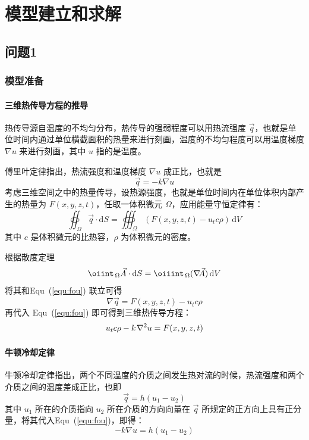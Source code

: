 \documentclass[../main.tex]{subfiles}
\begin{document}
\section{模型建立和求解}

\subsection{问题1}
\subsubsection{模型准备}
\paragraph{三维热传导方程的推导}
热传导源自温度的不均匀分布，热传导的强弱程度可以用热流强度 \(\vec{q}\)，也就是单位时间内通过单位横截面积的热量来进行刻画，温度的不均匀程度可以用温度梯度 \(\nabla u\) 来进行刻画，其中 \(u\) 指的是温度。

傅里叶定律指出，热流强度和温度梯度 \(\nabla u\) 成正比，也就是
\begin{equation}\label{equ:fou}
\vec q = - k \nabla u
\end{equation}
考虑三维空间之中的热量传导，设热源强度，也就是单位时间内在单位体积内部产生的热量为 \(F (x,  y , z, t)\)，任取一体积微元 \(\Omega\)，应用能量守恒定律有：
\begin{equation}
\oiint _{\, \Omega} \vec q \cdot \mathrm{d} S = \oiiint _{\, \Omega} ( F (x , y , z,t) - u _{t} c \rho ) \, \mathrm{d} V
\end{equation}
其中 \(c\) 是体积微元的比热容，\(\rho\) 为体积微元的密度。

根据散度定理
\begin{equation}
\oiint _{\,\Omega} \vec A  \cdot \mathrm{d} S = \oiiint _{\,\Omega} ( \nabla\kern -1.8pt\vec A) \, \mathrm{d}V
\end{equation}
将其和Equ~(\ref{equ:fou}) 联立可得
\begin{equation}
\nabla \vec q = F (x , y , z ,t) - u_{t} c \rho
\end{equation}
再代入 Equ~(\ref{equ:fou}) 即可得到三维热传导方程：
\begin{equation}\label{equ:cond}
u_{t} c \rho - k\kern 1pt \nabla^{2} u = F (x , y , z, t)
\end{equation}

\paragraph{牛顿冷却定律}
牛顿冷却定律指出，两个不同温度的介质之间发生热对流的时候，热流强度和两个介质之间的温度差成正比，也即
\begin{equation}
\vec q = h (u_1 - u_2)
\end{equation}
其中 \(u_1\) 所在的介质指向 \(u_2\) 所在介质的方向向量在 \(\vec q\) 所规定的正方向上具有正分量，将其代入Equ~(\ref{equ:fou})，即得：
\begin{equation}\label{equ:len}
{-k} \nabla u = h ( u_1 - u_2)
\end{equation}
\end{document}

